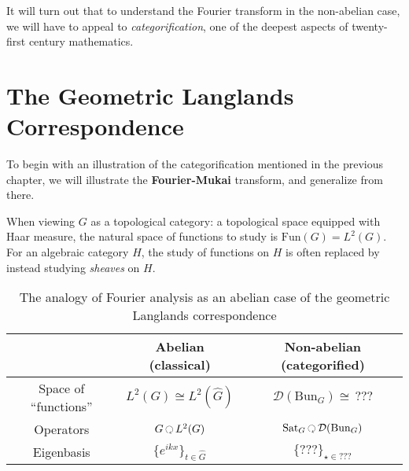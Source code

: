 It will turn out that to understand the Fourier transform in the non-abelian case, we will have to appeal to \emph{categorification}, one of the deepest aspects of twenty-first century mathematics.


\section{The Geometric Langlands Correspondence} %
\label{sec:the_geometric_langlands_correspondence}

To begin with an illustration of the categorification mentioned in the previous chapter, we will illustrate the \textbf{Fourier-Mukai} transform, and generalize from there. 

When viewing $G$ as a topological category: a topological space equipped with Haar measure, the natural space of functions to study is $\mathrm{Fun}(G) = L^2(G)$. For an algebraic category $H$, the study of functions on $H$ is often replaced by instead studying \emph{sheaves} on $H$.
 
\begin{table}[h!]
	\centering
\begin{tabular}{|c|c|c|}
	& Abelian (classical) & Non-abelian (categorified)\\
	\hline
	Space of ``functions'' & $L^2(G) \cong L^2(\hat G)$ & $\mathcal D (\mathrm{Bun}_G) \cong \, ???$\\
	Operators & $G \lacts L^2(G)$ & $\mathrm{Sat}_G \lacts \mathcal D (\mathrm{Bun}_G)$\\
	Eigenbasis & $\{e^{ikx}\}_{t \in \hat G}$ & $\{???\}_{\star \in ???}$
	\end{tabular}
\caption{The analogy of Fourier analysis as an abelian case of the geometric Langlands correspondence}
\label{table:fourier}
\end{table}


